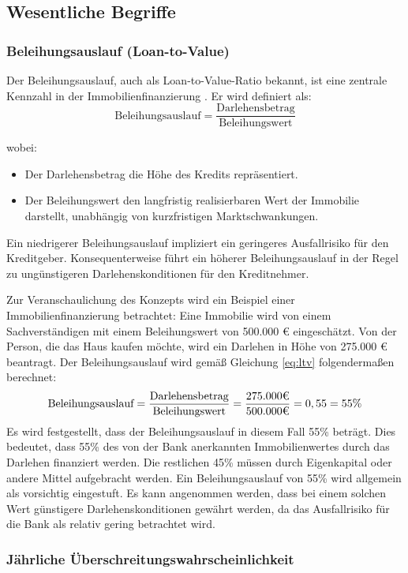
\subsection{Wesentliche Begriffe}
\subsubsection{Beleihungsauslauf (Loan-to-Value)}
Der Beleihungsauslauf, auch als Loan-to-Value-Ratio bekannt, ist eine zentrale Kennzahl in der Immobilienfinanzierung \parencite{BelWertV_3}. Er wird definiert als:
\begin{equation}
    \text{Beleihungsauslauf} = \frac{\text{Darlehensbetrag}}{\text{Beleihungswert}}
    \label{eq:ltv}
\end{equation}

\noindent wobei:
\begin{itemize}
    \item Der Darlehensbetrag die Höhe des Kredits repräsentiert.
    \item Der Beleihungswert den langfristig realisierbaren Wert der Immobilie darstellt, unabhängig von kurzfristigen Marktschwankungen.
\end{itemize}

Ein niedrigerer Beleihungsauslauf impliziert ein geringeres Ausfallrisiko für den Kreditgeber. Konsequenterweise führt ein höherer Beleihungsauslauf in der Regel zu ungünstigeren Darlehenskonditionen für den Kreditnehmer.

Zur Veranschaulichung des Konzepts wird ein Beispiel einer Immobilienfinanzierung betrachtet:
Eine Immobilie wird von einem Sachverständigen mit einem Beleihungswert von 500.000 € eingeschätzt. Von der Person, die das Haus kaufen möchte, wird ein Darlehen in Höhe von 275.000 € beantragt.
Der Beleihungsauslauf wird gemäß Gleichung \ref{eq:ltv} folgendermaßen berechnet:
\begin{equation}
    \text{Beleihungsauslauf} = \frac{\text{Darlehensbetrag}}{\text{Beleihungswert}} = \frac{275.000 \mbox{\texteuro}}{500.000 \mbox{\texteuro}} = 0,55 = 55\%
\end{equation}
Es wird festgestellt, dass der Beleihungsauslauf in diesem Fall 55\% beträgt. Dies bedeutet, dass 55\% des von der Bank anerkannten Immobilienwertes durch das Darlehen finanziert werden. Die restlichen 45\% müssen durch Eigenkapital oder andere Mittel aufgebracht werden.
Ein Beleihungsauslauf von 55\% wird allgemein als vorsichtig eingestuft. Es kann angenommen werden, dass bei einem solchen Wert günstigere Darlehenskonditionen gewährt werden, da das Ausfallrisiko für die Bank als relativ gering betrachtet wird.
\subsubsection{Jährliche Überschreitungswahrscheinlichkeit}